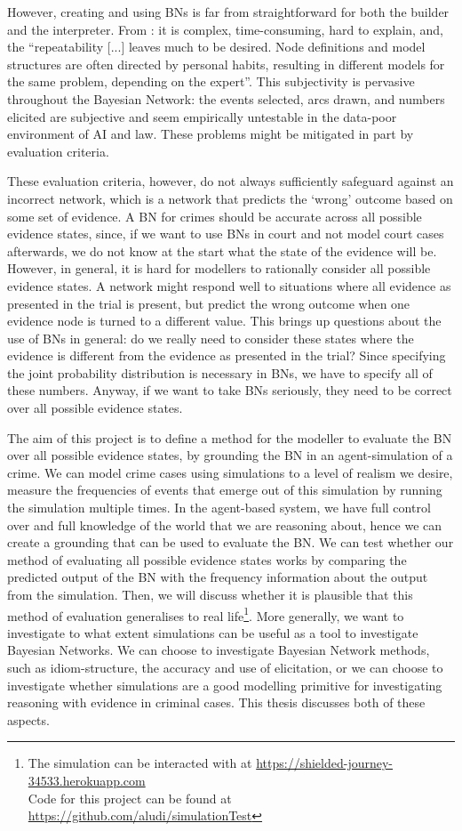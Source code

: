 \documentclass[12pt]{article}
\begin{document}
However, creating and using BNs is far from straightforward for both the builder and the interpreter. From \citet{deKoeijer2020}: it is complex, time-consuming, hard to explain, and, the ``repeatability [...] leaves much to be desired. Node definitions and model structures are often directed by personal habits, resulting in different models for the same problem, depending on the expert''. This subjectivity is pervasive throughout the Bayesian Network: the events selected, arcs drawn, and numbers elicited are subjective and seem empirically untestable in the data-poor environment of AI and law. These problems might be mitigated in part by evaluation criteria. 

These evaluation criteria, however, do not always sufficiently safeguard against an incorrect network, which is a network that predicts the `wrong' outcome based on some set of evidence. A BN for crimes should be accurate across all possible evidence states, since, if we want to use BNs in court and not model court cases afterwards, we do not know at the start what the state of the evidence will be. However, in general, it is hard for modellers to rationally consider all possible evidence states. A network might respond well to situations where all evidence as presented in the trial is present, but predict the wrong outcome when one evidence node is turned to a different value. This brings up questions about the use of BNs in general: do we really need to consider these states where the evidence is different from the evidence as presented in the trial? Since specifying the joint probability distribution is necessary in BNs, we have to specify all of these numbers. Anyway, if we want to take BNs seriously, they need to be correct over all possible evidence states.

 The aim of this project is to define a method for the modeller to evaluate the BN over all possible evidence states, by grounding the BN in an agent-simulation of a crime. We can model crime cases using simulations to a level of realism we desire, measure the frequencies of events that emerge out of this simulation by running the simulation multiple times. In the agent-based system, we have full control over and full knowledge of the world that we are reasoning about, hence we can create a grounding that can be used to evaluate the BN. We can test whether our method of evaluating all possible evidence states works by comparing the predicted output of the BN with the frequency information about the output from the simulation. Then, we will discuss whether it is plausible that this method of evaluation generalises to real life\footnote{The simulation can be interacted with at \url{https://shielded-journey-34533.herokuapp.com} \\ Code for this project can be found at \url{https://github.com/aludi/simulationTest}}. More generally, we want to investigate to what extent simulations can be useful as a tool to investigate Bayesian Networks. We can choose to investigate Bayesian Network methods, such as idiom-structure, the accuracy and use of elicitation, or we can choose to investigate whether simulations are a good modelling primitive for investigating reasoning with evidence in criminal cases. This thesis discusses both of these aspects.
 
\end{document}
